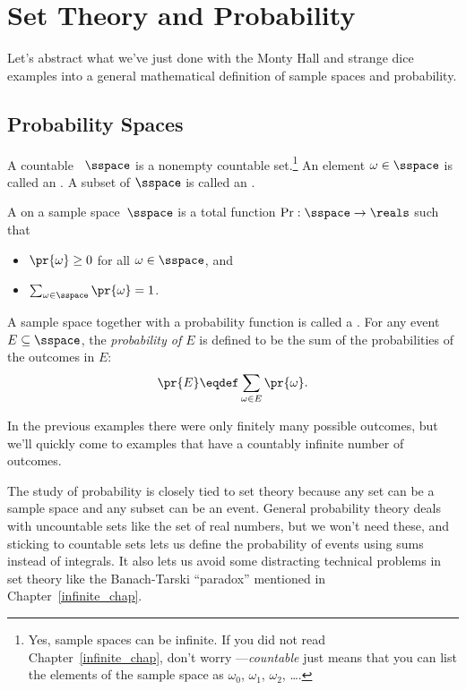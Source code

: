 \section{Set Theory and Probability}\label{probability_sets_sec}

Let's abstract what we've just done with the Monty Hall and strange
dice examples into a general mathematical definition of sample spaces
and probability.

\subsection{Probability Spaces}

\begin{definition}\label{LN12:sampsp}
  A countable ~$\sspace$ is a nonempty countable
  set.\footnote{Yes, sample spaces can be infinite.  If you did not
    read Chapter~\ref{infinite_chap}, don't worry ---\emph{countable}
    just means that you can list the elements of the sample space as
    $\omega_0$, $\omega_1$, $\omega_2$, \dots.}  An element $\omega
  \in \sspace$ is called an .  A subset of $\sspace$ is
  called an .
\end{definition}

\begin{definition}\label{LN12:probsp}
 A  on a sample space~$\sspace$ is a total
 function $\operatorname{Pr}: \sspace\to \reals$ such that
\begin{itemize}
\item $\pr{\omega} \geq 0$ for all $\omega \in \sspace$, and
\item $\sum_{\omega \in \sspace} \pr{\omega} = 1$.
\end{itemize}
A sample space together with a probability function is called a
.
For any event $E \subseteq \sspace$, the 
\emph{probability of $E$} is defined to be the sum of the probabilities of
the outcomes in $E$:
\[
    \pr{E} \eqdef \sum_{\omega \in E} \pr{\omega}.
\]
\end{definition}

In the previous examples there were only finitely many possible
outcomes, but we'll quickly come to examples that have a countably
infinite number of outcomes.

The study of probability is closely tied to set theory
because any set can be a sample space and any subset can be an event.
General probability theory deals with uncountable sets like the set of
real numbers, but we won't need these, and sticking to countable
sets lets us define the probability of events using sums instead of
integrals.  It also lets us avoid some distracting technical problems
in set theory like the Banach-Tarski ``paradox'' mentioned in
Chapter~\ref{infinite_chap}.

